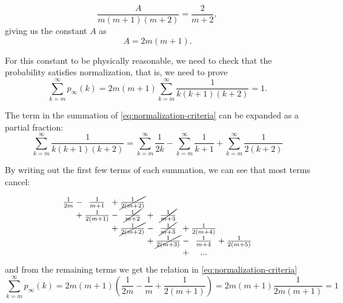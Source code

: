 \begin{equation}
	\frac{A}{m(m+1)(m+2)} = \frac{2}{m+2}, 
\end{equation}
giving us the constant $A$ as
\begin{equation}
	A = 2m(m+1).
	\label{eq:normalization-constant}
\end{equation}

For this constant to be physically reasonable, we need to check that the probability satisfies normalization, that is, we need to prove
\begin{equation}
	\sum_{k=m}^\infty p_{\infty}(k) = 2m(m+1)\sum_{k=m}^\infty \frac{1}{k(k+1)(k+2)} = 1. 
	\label{eq:normalization-criteria}
\end{equation}

The term in the summation of \autoref{eq:normalization-criteria} can be expanded as a partial fraction:
\begin{equation}
	\sum_{k=m}^\infty \frac{1}{k(k+1)(k+2)} = \sum_{k=m}^\infty \frac{1}{2k} - \sum_{k=m}^\infty \frac{1}{k+1} + \sum_{k=m}^\infty \frac{1}{2(k+2)}
	\label{eq:partial-fractions}
\end{equation}

By writing out the first few terms of each summation, we can see that most terms cancel:

\begin{equation}
\setlength{\arraycolsep}{0pt}%
\newcolumntype{B}{>{{}}c<{{}}}
\begin{array}{ B l B l B l B l B l B}
	\frac{1}{2m} & {}-{} &\frac{1}{m+1} & {}+{} & \cancel{\frac{1}{2(m+2)}} & \\
	& {}+{} & \frac{1}{2(m+1)} & {}-{} &\cancel{\frac{1}{m+2}} & {}+{} &\cancel{\frac{1}{m+3}} \\
	& & & {}+{} & \cancel{\frac{1}{2(m+2)}} & {}-{} & \cancel{\frac{1}{m+3}} & {}+{} &\frac{1}{2(m+4)} \\
	& & & & & {}+{}& \cancel{\frac{1}{2(m+3)}} & {}-{} & \frac{1}{m+4} & {}+{} & \frac{1}{2(m+5)} \\
	& & & & & & & {}+{}& ...\\
\end{array}
\label{eq:summation-cancel}
\end{equation}
and from the remaining terms we get the relation in \autoref{eq:normalization-criteria}
\begin{equation}
	 \sum_{k=m}^\infty p_{\infty}(k) = 2m(m+1)\left ( \frac{1}{2m} - \frac{1}{m} + \frac{1}{2(m+1)} \right ) = 2m(m+1) \frac{1}{2m(m+1)} = 1
	 \label{eq:normalization-satisfied}
\end{equation}

